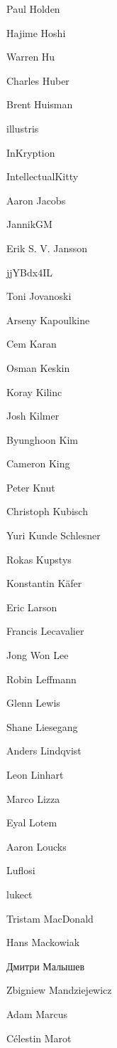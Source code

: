 \begin{DoxyItemize}
\item Paul Holden
\item Hajime Hoshi
\item Warren Hu
\item Charles Huber
\item Brent Huisman
\item illustris
\item In\+Kryption
\item Intellectual\+Kitty
\item Aaron Jacobs
\item Jannik\+GM
\item Erik S. V. Jansson
\item jj\+YBdx4\+IL
\item Toni Jovanoski
\item Arseny Kapoulkine
\item Cem Karan
\item Osman Keskin
\item Koray Kilinc
\item Josh Kilmer
\item Byunghoon Kim
\item Cameron King
\item Peter Knut
\item Christoph Kubisch
\item Yuri Kunde Schlesner
\item Rokas Kupstys
\item Konstantin Käfer
\item Eric Larson
\item Francis Lecavalier
\item Jong Won Lee
\item Robin Leffmann
\item Glenn Lewis
\item Shane Liesegang
\item Anders Lindqvist
\item Leon Linhart
\item Marco Lizza
\item Eyal Lotem
\item Aaron Loucks
\item Luflosi
\item lukect
\item Tristam Mac\+Donald
\item Hans Mackowiak
\item Дмитри Малышев
\item Zbigniew Mandziejewicz
\item Adam Marcus
\item Célestin Marot

\end{DoxyItemize}
